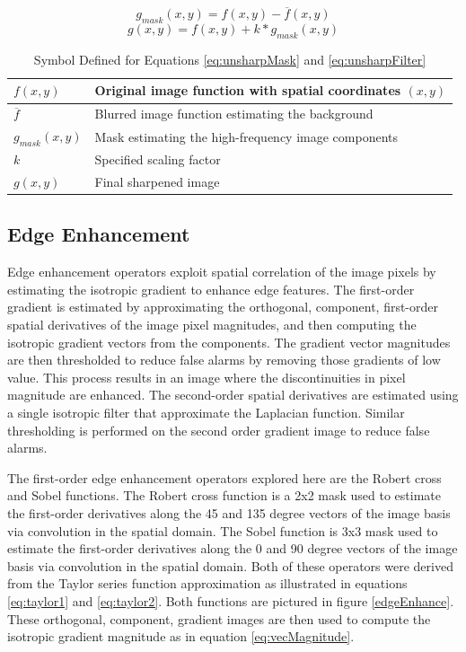 \documentclass[journal]{IEEEtran}
\begin{document}
\begin{equation} \label{eq:unsharpMask}
g_{mask}(x,y) = f(x,y) - \overline{f}(x,y)
\end{equation}
\begin{equation} \label{eq:unsharpFilter}
g(x,y) = f(x,y) + k * g_{mask}(x,y)
\end{equation}

\begin{table}[h]
 \centering
 \begin{tabular}{|l|l|}
  \hline
  \(f(x,y)\) & Original image function with spatial coordinates \((x,y)\)\\ \hline
  \(\overline{f}\) & Blurred image function estimating the background \\ \hline
  \(g_{mask}(x,y)\) & Mask estimating the high-frequency image components \\ \hline
  \(k\) & Specified scaling factor \\ \hline
  \(g(x,y)\) & Final sharpened image \\ \hline
 \end{tabular}
 \caption{Symbol Defined for Equations \ref{eq:unsharpMask} and \ref{eq:unsharpFilter}}
 \label{tab:unsharpMasking}
\end{table}

\subsection{Edge Enhancement}
Edge enhancement operators exploit spatial correlation of the image pixels by estimating the isotropic gradient to enhance edge features. The first-order gradient is estimated by approximating the orthogonal, component, first-order spatial derivatives of the image pixel magnitudes, and then computing the isotropic gradient vectors from the components. The gradient vector magnitudes are then thresholded to reduce false alarms by removing those gradients of low value. This process results in an image where the discontinuities in pixel magnitude are enhanced. The second-order spatial derivatives are estimated using a single isotropic filter that approximate the Laplacian function. Similar thresholding is performed on the second order gradient image to reduce false alarms.

\par The first-order edge enhancement operators explored here are the Robert cross and Sobel functions. The Robert cross function is a 2x2 mask used to estimate the first-order derivatives along the 45 and 135 degree vectors of the image basis via convolution in the spatial domain. The Sobel function is 3x3 mask used to estimate the first-order derivatives along the 0 and 90 degree vectors of the image basis via convolution in the spatial domain. Both of these operators were derived from the Taylor series function approximation as illustrated in equations \ref{eq:taylor1} and \ref{eq:taylor2}. Both functions are pictured in figure \ref{edgeEnhance}. These orthogonal, component, gradient images are then used to compute the isotropic gradient magnitude as in equation \ref{eq:vecMagnitude}. \cite[p.~119-129]{Nixon}
\end{document}
